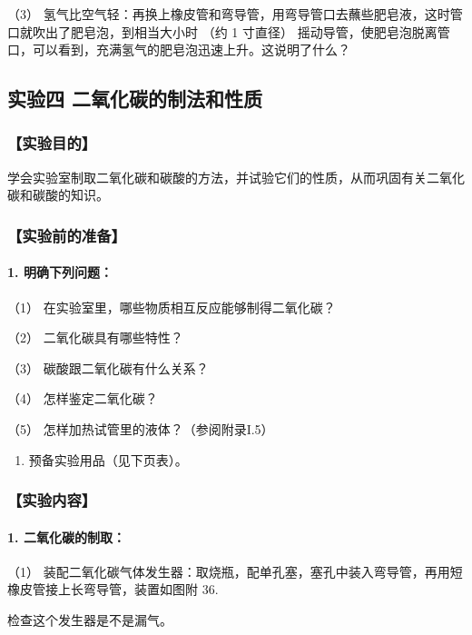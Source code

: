 （3）
氢气比空气轻：再换上橡皮管和弯导管，用弯导管口去蘸些肥皂液，这时管口就吹出了肥皂泡，到相当大小时
（约 1 寸直径）
摇动导管，使肥皂泡脱离管口，可以看到，充满氢气的肥皂泡迅速上升。这说明了什么？

\subsection{实验四 二氧化碳的制法和性质}

\subsubsection{【实验目的】}

学会实验室制取二氧化碳和碳酸的方法，并试验它们的性质，从而巩固有关二氧化碳和碳酸的知识。

\subsubsection{【实验前的准备】}

\paragraph{1. 明确下列问题：}

（1） 在实验室里，哪些物质相互反应能够制得二氧化碳？

（2） 二氧化碳具有哪些特性？

（3） 碳酸跟二氧化碳有什么关系？

（4） 怎样鉴定二氧化碳？

（5） 怎样加热试管里的液体？（参阅附录I.5）

\begin{enumerate}[start=2]
\item
  预备实验用品（见下页表）。
\end{enumerate}

\subsubsection{【实验内容】}

\paragraph{1. 二氧化碳的制取：}

（1）
装配二氧化碳气体发生器：取烧瓶，配单孔塞，塞孔中装入弯导管，再用短橡皮管接上长弯导管，装置如图附
36.

检查这个发生器是不是漏气。

